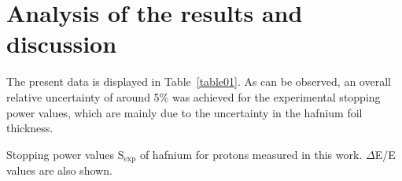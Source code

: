 \documentclass[aps,pra,reprint,superscriptaddress]{revtex4-1}
\begin{document}
\section{Analysis of the results and discussion}
\label{discussion}

The present data is displayed in 
Table~\ref{table01}. %
As can be observed, %
an overall relative uncertainty of around 5\% was 
achieved for the experimental stopping power values, which are mainly 
due to the uncertainty in the hafnium foil thickness. 

\begin{table}[!t]
\centering
\caption{Stopping power values S$_{\mathrm{exp}}$ of hafnium for protons 
measured in this work. $\Delta$E/E values are also shown.}
\label{table01}

\vspace{0.2cm}


\end{table}
\end{document}
